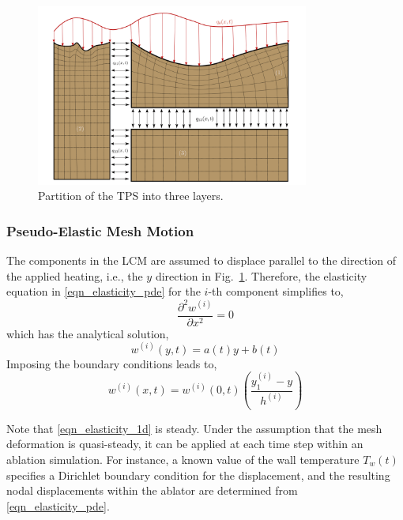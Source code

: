 \begin{figure}
    \centering
    \includegraphics[width=0.8\textwidth]{./figs/three_components.png}
    \caption{Partition of the TPS into three layers.}
    \label{fig_lcm_domain}
\end{figure}

\subsubsection{Pseudo-Elastic Mesh Motion}

The components in the LCM are assumed to displace parallel to the direction of the applied heating, i.e., the $y$ direction in Fig.~\ref{fig_lcm_domain}. Therefore, the elasticity equation in \cref{eqn_elasticity_pde} for the $i$-th component simplifies to,
\begin{equation}
    \frac{\partial^2 w^{(i)}}{\partial x^2} = 0
\end{equation}
which has the analytical solution,
\begin{equation}
    w^{(i)}(y,t) = a(t)y + b(t)
\end{equation}
Imposing the boundary conditions leads to,
\begin{equation}
    w^{(i)}(x,t) = w^{(i)}(0,t)\left(\frac{y_1^{(i)} - y}{h^{(i)}}\right)
\end{equation}




Note that \cref{eqn_elasticity_1d} is steady. Under the assumption that the mesh deformation is quasi-steady, it can be applied at each time step within an ablation simulation. For instance, a known value of the wall temperature $T_w(t)$ specifies a Dirichlet boundary condition for the displacement, and the resulting nodal displacements within the ablator are determined from \cref{eqn_elasticity_pde}.

